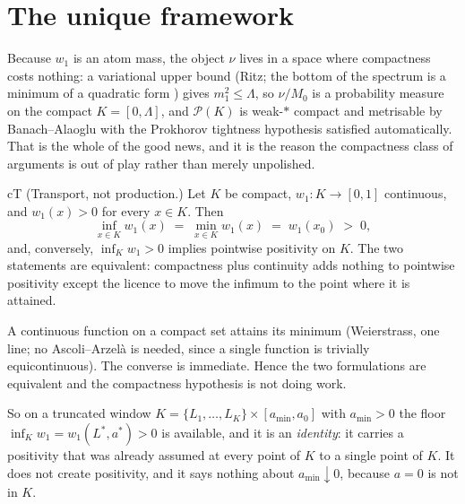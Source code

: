 \section{The unique framework}
\label{sec:reduction-framework}

Because $w_1$ is an atom mass, the object $\nu$ lives in a space where compactness costs nothing: a
variational upper bound (Ritz; the bottom of the spectrum is a minimum of a quadratic form
\cite{reed-simon}) gives $m_1^2\le\Lambda$, so $\nu/M_0$ is a probability measure on the
compact $K=[0,\Lambda]$, and $\mathcal{P}(K)$ is weak-$*$ compact and metrisable by
Banach--Alaoglu with the Prokhorov tightness hypothesis satisfied automatically. That is the whole
of the good news, and it is the reason the compactness class of arguments is out of play rather
than merely unpolished.

\begin{claimbox}{cT}
 (Transport, not production.) Let $K$ be compact, $w_1:K\to[0,1]$ continuous,
and $w_1(x)>0$ for every $x\in K$. Then
\[
  \inf_{x\in K} w_1(x)\;=\;\min_{x\in K} w_1(x)\;=\;w_1(x_0)\;>\;0 ,
\]
and, conversely, $\inf_K w_1>0$ implies pointwise positivity on $K$. The two statements are
equivalent: compactness plus continuity adds nothing to pointwise positivity except the licence to
move the infimum to the point where it is attained.
\end{claimbox}
\begin{proofx}
A continuous function on a compact set attains its minimum (Weierstrass, one line; no Ascoli--Arzel\`a
is needed, since a single function is trivially equicontinuous). The converse is immediate. Hence
the two formulations are equivalent and the compactness hypothesis is not doing work.
\end{proofx}

So on a truncated window $K=\{L_1,\dots,L_K\}\times[a_{\min},a_0]$ with $a_{\min}>0$ the floor
$\inf_K w_1=w_1(L^*,a^*)>0$ is available, and it is an \emph{identity}: it carries a positivity that
was already assumed at every point of $K$ to a single point of $K$. It does not create positivity,
and it says nothing about $a_{\min}\downarrow 0$, because $a=0$ is not in $K$.

